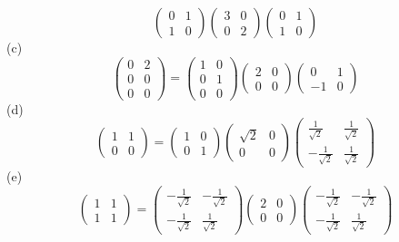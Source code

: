 \documentclass{article}
\begin{document}
\begin{enumerate}
$$\left( \begin{array}{cc} 0 & 1 \\ 1 & 0  \end{array} \right)
\left( \begin{array}{cc} 3 & 0 \\ 0 & 2  \end{array} \right)
\left( \begin{array}{cc} 0 & 1 \\ 1 & 0  \end{array} \right)$$
(c) 
$$\left( \begin{array}{cc} 0 & 2 \\ 0 & 0 \\ 0 & 0  \end{array} \right) = 
\left( \begin{array}{cc} 1 & 0 \\ 0 & 1 \\ 0 & 0  \end{array} \right)
\left( \begin{array}{cc} 2 & 0 \\ 0 & 0  \end{array} \right)
\left( \begin{array}{cc} 0 & 1 \\ -1 & 0  \end{array} \right)$$
(d) 
$$\left( \begin{array}{cc} 1 & 1 \\ 0 & 0  \end{array} \right) = 
\left( \begin{array}{cc} 1 & 0 \\ 0 & 1  \end{array} \right)
\left( \begin{array}{cc} \sqrt{2} & 0 \\ 0 & 0  \end{array} \right)
\left( \begin{array}{cc} \frac{1}{\sqrt{2}} & \frac{1}{\sqrt{2}} \\ -\frac{1}{\sqrt{2}} & \frac{1}{\sqrt{2}}  \end{array} \right)$$
(e) 
$$\left( \begin{array}{cc} 1 & 1 \\ 1 & 1  \end{array} \right) = 
\left( \begin{array}{cc} -\frac{1}{\sqrt{2}} & -\frac{1}{\sqrt{2}} \\ -\frac{1}{\sqrt{2}} & \frac{1}{\sqrt{2}}  \end{array} \right)
\left( \begin{array}{cc} 2 & 0 \\ 0 & 0  \end{array} \right)
\left( \begin{array}{cc} -\frac{1}{\sqrt{2}} & -\frac{1}{\sqrt{2}} \\ -\frac{1}{\sqrt{2}} & \frac{1}{\sqrt{2}}  \end{array} \right)$$


\end{enumerate}
\end{document}
